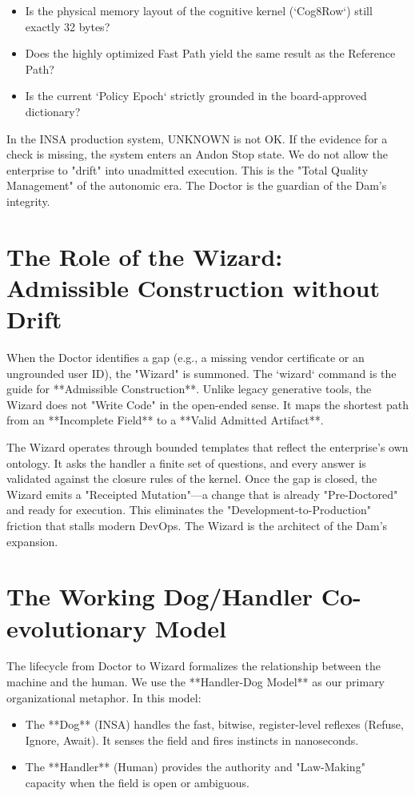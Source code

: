 \documentclass[12pt,a4paper,oneside]{book}
\begin{document}
\begin{itemize}
    \item Is the physical memory layout of the cognitive kernel (`Cog8Row`) still exactly 32 bytes?
    \item Does the highly optimized Fast Path yield the same result as the Reference Path?
    \item Is the current `Policy Epoch` strictly grounded in the board-approved dictionary?
\end{itemize}

In the INSA production system, UNKNOWN is not OK. If the evidence for a check is missing, the system enters an Andon Stop state. We do not allow the enterprise to "drift" into unadmitted execution. This is the "Total Quality Management" of the autonomic era. The Doctor is the guardian of the Dam's integrity.

\section{The Role of the Wizard: Admissible Construction without Drift}
When the Doctor identifies a gap (e.g., a missing vendor certificate or an ungrounded user ID), the "Wizard" is summoned. The `wizard` command is the guide for **Admissible Construction**. Unlike legacy generative tools, the Wizard does not "Write Code" in the open-ended sense. It maps the shortest path from an **Incomplete Field** to a **Valid Admitted Artifact**. 

The Wizard operates through bounded templates that reflect the enterprise's own ontology. It asks the handler a finite set of questions, and every answer is validated against the closure rules of the kernel. Once the gap is closed, the Wizard emits a "Receipted Mutation"---a change that is already "Pre-Doctored" and ready for execution. This eliminates the "Development-to-Production" friction that stalls modern DevOps. The Wizard is the architect of the Dam's expansion.

\section{The Working Dog/Handler Co-evolutionary Model}
The lifecycle from Doctor to Wizard formalizes the relationship between the machine and the human. We use the **Handler-Dog Model** as our primary organizational metaphor. In this model:

\begin{itemize}
    \item The **Dog** (INSA) handles the fast, bitwise, register-level reflexes (Refuse, Ignore, Await). It senses the field and fires instincts in nanoseconds.
    \item The **Handler** (Human) provides the authority and "Law-Making" capacity when the field is open or ambiguous.
\end{itemize}
\end{document}
